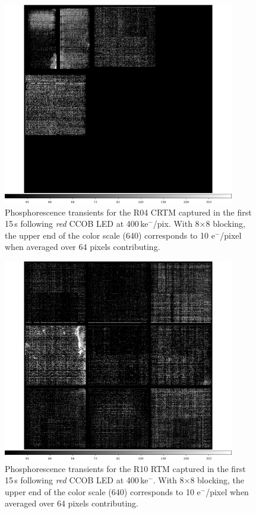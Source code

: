 \begin{figure}[!htbp]
\centering
\includegraphics[width=0.9\textwidth]{sections/figures/phosphorescence-survey/itl_fluor_R04_0-19_rb1_log.png}
\caption{Phosphorescence transients for the R04 CRTM captured in the first 15\,s following {\it red} CCOB LED at 400\,ke$^-$/pix. With 8$\times$8 blocking, the upper end of the color scale (640) corresponds to 10 e$^-$/pixel when averaged over 64 pixels contributing.}
\label{fig:phos:R04}
\end{figure}

\begin{figure}[!htbp]
\centering
\includegraphics[width=0.9\textwidth]{sections/figures/phosphorescence-survey/itl_fluor_R10_0-19_rb1_log.png}
\caption{Phosphorescence transients for the R10 RTM captured in the first 15\,s following {\it red} CCOB LED at 400\,ke$^-$. With 8$\times$8 blocking, the upper end of the color scale (640) corresponds to 10 e$^-$/pixel when averaged over 64 pixels contributing.}
\label{fig:phos:R10}
\end{figure}

